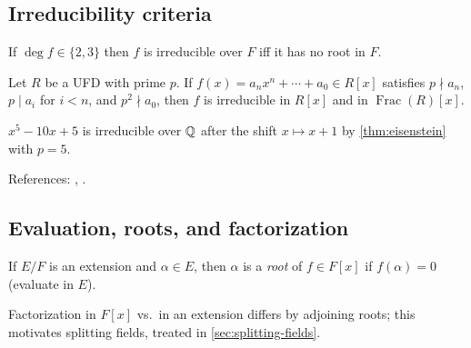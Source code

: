 \subsection{Irreducibility criteria}
\begin{proposition}[Degree $2$ or $3$]
If $\deg f\in\{2,3\}$ then $f$ is irreducible over $F$ iff it has no root in $F$.
\end{proposition}
\begin{theorem}[Eisenstein]\label{thm:eisenstein}
Let $R$ be a UFD with prime $p$. If $f(x)=a_nx^n+\cdots+a_0\in R[x]$ satisfies $p\nmid a_n$, $p\mid a_i$ for $i<n$, and $p^2\nmid a_0$, then $f$ is irreducible in $R[x]$ and in $\operatorname{Frac}(R)[x]$.
\end{theorem}
\begin{example}
$x^5-10x+5$ is irreducible over $\mathbb{Q}$ after the shift $x\mapsto x+1$ by \cref{thm:eisenstein} with $p=5$.
\end{example}
References: \cite[\S9--11]{DF}, \cite[Ch.~II]{Lang}.

\subsection{Evaluation, roots, and factorization}
\begin{definition}
If $E/F$ is an extension and $\alpha\in E$, then $\alpha$ is a \emph{root} of $f\in F[x]$ if $f(\alpha)=0$ (evaluate in $E$).
\end{definition}
\begin{remark}
Factorization in $F[x]$ vs.\ in an extension differs by adjoining roots; this motivates splitting fields, treated in \cref{sec:splitting-fields}.
\end{remark}
